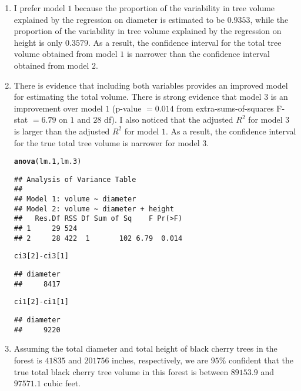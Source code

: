 \documentclass[12pt]{article}\usepackage[]{graphicx}\usepackage[]{color}
\makeatletter
\newcommand{\hlnum}[1]{\textcolor[rgb]{0.686,0.059,0.569}{#1}}%
\newcommand{\hlopt}[1]{\textcolor[rgb]{0,0,0}{#1}}%
\newcommand{\hlstd}[1]{\textcolor[rgb]{0.345,0.345,0.345}{#1}}%
\newcommand{\hlkwd}[1]{\textcolor[rgb]{0.737,0.353,0.396}{\textbf{#1}}}%
\newenvironment{kframe}{%
 \def\at@end@of@kframe{}%
 \ifinner\ifhmode%
  \def\at@end@of@kframe{\end{minipage}}%
  \begin{minipage}{\columnwidth}%
 \fi\fi%
 \def\FrameCommand##1{\hskip\@totalleftmargin \hskip-\fboxsep
 \colorbox{shadecolor}{##1}\hskip-\fboxsep
     \hskip-\linewidth \hskip-\@totalleftmargin \hskip\columnwidth}%
 \MakeFramed {\advance\hsize-\width
   \@totalleftmargin\z@ \linewidth\hsize
   \@setminipage}}%
 {\par\unskip\endMakeFramed%
 \at@end@of@kframe}
\newenvironment{knitrout}{}{} %
\makeatother
\begin{document}
\begin{doublespacing}
\begin{enumerate}
\begin{enumerate}
\item I prefer model $1$ because the proportion of the variability in tree volume explained by the regression on diameter is estimated to be $0.9353$, while the proportion of the variability in tree volume explained by the regression on height is only $0.3579$. As a result, the confidence interval for the total tree volume obtained from model $1$ is narrower than the confidence interval obtained from model $2$. 

\item There is evidence that including both variables provides an improved model for estimating the total volume. There is strong evidence that model $3$ is an improvement over model $1$ (p-value $= 0.014$ from extra-sums-of-squares F-stat $= 6.79$ on $1$ and $28$ df). I also noticed that the adjusted $R^2$ for model $3$ is larger than the adjusted $R^2$ for model $1$. As a result, the confidence interval for the true total tree volume is narrower for model $3$.

\begin{singlespace}
\begin{knitrout}\footnotesize
{}\color{fgcolor}\begin{kframe}
\begin{alltt}
\hlkwd{anova}\hlstd{(lm.1, lm.3)}
\end{alltt}
\begin{verbatim}
## Analysis of Variance Table
## 
## Model 1: volume ~ diameter
## Model 2: volume ~ diameter + height
##   Res.Df RSS Df Sum of Sq    F Pr(>F)
## 1     29 524                         
## 2     28 422  1       102 6.79  0.014
\end{verbatim}
\begin{alltt}
\hlstd{ci3[}\hlnum{2}\hlstd{]}\hlopt{-}\hlstd{ci3[}\hlnum{1}\hlstd{]}
\end{alltt}
\begin{verbatim}
## diameter 
##     8417
\end{verbatim}
\begin{alltt}
\hlstd{ci1[}\hlnum{2}\hlstd{]}\hlopt{-}\hlstd{ci1[}\hlnum{1}\hlstd{]}
\end{alltt}
\begin{verbatim}
## diameter 
##     9220
\end{verbatim}
\end{kframe}
\end{knitrout}
\end{singlespace}

\item Assuming the total diameter and total height of black cherry trees in the forest is $41835$ and $201756$ inches, respectively, we are $95\%$ confident that the true total black cherry tree volume in this forest is between $89153.9$ and $97571.1$ cubic feet.

\end{enumerate}


\end{enumerate}

\end{doublespacing}
\end{document}
